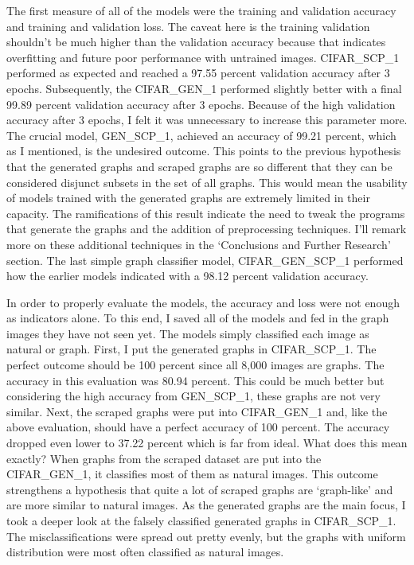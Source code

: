 \documentclass[12pt]{article}
\begin{document}
            The first measure of all of the models were the training and validation accuracy and training and validation loss. 
            The caveat here is the training validation shouldn’t be much higher than the validation accuracy 
            because that indicates overfitting and future poor performance with untrained images. 
            CIFAR\_SCP\_1 performed as expected and reached a 97.55 percent validation accuracy after 3 epochs. 
            Subsequently, the CIFAR\_GEN\_1 performed slightly better with a final 99.89 percent validation accuracy after 3 epochs. 
            Because of the high validation accuracy after 3 epochs, I felt it was unnecessary to increase this parameter more. 
            The crucial model, GEN\_SCP\_1, achieved an accuracy of 99.21 percent, 
            which as I mentioned, is the undesired outcome. This points to the previous hypothesis that the generated graphs 
            and scraped graphs are so different that they can be considered disjunct subsets in the set of all graphs. 
            This would mean the usability of models trained with the generated graphs are extremely limited in their capacity. 
            The ramifications of this result indicate the need to tweak the programs 
            that generate the graphs and the addition of preprocessing techniques. 
            I’ll remark more on these additional techniques in the ‘Conclusions and Further Research’ section. 
            The last simple graph classifier model, CIFAR\_GEN\_SCP\_1 performed 
            how the earlier models indicated with a 98.12 percent validation accuracy.

            In order to properly evaluate the models, the accuracy and loss were not enough as indicators alone. 
            To this end, I saved all of the models and fed in the graph images they have not seen yet. 
            The models simply classified each image as natural or graph. First, I put the generated graphs in CIFAR\_SCP\_1. 
            The perfect outcome should be 100 percent since all 8,000 images are graphs. 
            The accuracy in this evaluation was 80.94 percent. 
            This could be much better but considering the high accuracy from GEN\_SCP\_1, 
            these graphs are not very similar. Next, the scraped graphs were put into CIFAR\_GEN\_1 
            and, like the above evaluation, should have a perfect accuracy of 100 percent. 
            The accuracy dropped even lower to 37.22 percent which is far from ideal. 
            What does this mean exactly? When graphs from the scraped dataset are put into the CIFAR\_GEN\_1, 
            it classifies most of them as natural images. 
            This outcome strengthens a hypothesis that quite a lot of scraped graphs are ‘graph-like’ 
            and are more similar to natural images. As the generated graphs are the main focus, 
            I took a deeper look at the falsely classified generated graphs in CIFAR\_SCP\_1. 
            The misclassifications were spread out pretty evenly, 
            but the graphs with uniform distribution were most often classified as natural images.
            
\end{document}
